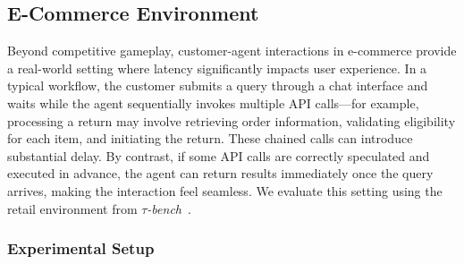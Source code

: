 \subsection{E-Commerce Environment}
\label{subsec:ecommerce}
Beyond competitive gameplay, customer-agent interactions in e-commerce provide a real-world setting where latency significantly impacts user experience. In a typical workflow, the customer submits a query through a chat interface and waits while the agent sequentially invokes multiple API calls—for example, processing a return may involve retrieving order information, validating eligibility for each item, and initiating the return. These chained calls can introduce substantial delay. By contrast, if some API calls are correctly speculated and executed in advance, the agent can return results immediately once the query arrives, making the interaction feel seamless. We evaluate this setting using the retail environment from \emph{$\tau$-bench}~\citep{yao_Taubench_2024}.
\subsubsection{Experimental Setup}
